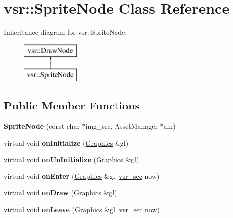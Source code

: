 \hypertarget{classvsr_1_1_sprite_node}{\section{vsr\-:\-:Sprite\-Node Class Reference}
\label{classvsr_1_1_sprite_node}
}
Inheritance diagram for vsr\-:\-:Sprite\-Node\-:\begin{figure}[H]
\begin{center}
\leavevmode
\includegraphics[height=2.000000cm]{classvsr_1_1_sprite_node}
\end{center}
\end{figure}
\subsection*{Public Member Functions}
\begin{DoxyCompactItemize}
\item 
\hypertarget{classvsr_1_1_sprite_node_a8a157008dec678da2f1b74dba12fc35f}{{\bfseries Sprite\-Node} (const char $\ast$img\-\_\-src, Asset\-Manager $\ast$am)}\label{classvsr_1_1_sprite_node_a8a157008dec678da2f1b74dba12fc35f}

\item 
\hypertarget{classvsr_1_1_sprite_node_a4a8f6e4e32af16eb7890baa755e5ce18}{virtual void {\bfseries on\-Initialize} (\hyperlink{classvsr_1_1_graphics}{Graphics} \&gl)}\label{classvsr_1_1_sprite_node_a4a8f6e4e32af16eb7890baa755e5ce18}

\item 
\hypertarget{classvsr_1_1_sprite_node_a9aa1c7c441e1a5964fe6830096677f01}{virtual void {\bfseries on\-Un\-Initialize} (\hyperlink{classvsr_1_1_graphics}{Graphics} \&gl)}\label{classvsr_1_1_sprite_node_a9aa1c7c441e1a5964fe6830096677f01}

\item 
\hypertarget{classvsr_1_1_sprite_node_ac74f05072855a587ab21d7e559fd3e04}{virtual void {\bfseries on\-Enter} (\hyperlink{classvsr_1_1_graphics}{Graphics} \&gl, \hyperlink{classvsr_1_1vsr__sec}{vsr\-\_\-sec} now)}\label{classvsr_1_1_sprite_node_ac74f05072855a587ab21d7e559fd3e04}

\item 
\hypertarget{classvsr_1_1_sprite_node_a683131775d3ac0515369d199a431d17b}{virtual void {\bfseries on\-Draw} (\hyperlink{classvsr_1_1_graphics}{Graphics} \&gl)}\label{classvsr_1_1_sprite_node_a683131775d3ac0515369d199a431d17b}

\item 
\hypertarget{classvsr_1_1_sprite_node_a3d957876cbc7c19008b98b5d8bcbd05d}{virtual void {\bfseries on\-Leave} (\hyperlink{classvsr_1_1_graphics}{Graphics} \&gl, \hyperlink{classvsr_1_1vsr__sec}{vsr\-\_\-sec} now)}\label{classvsr_1_1_sprite_node_a3d957876cbc7c19008b98b5d8bcbd05d}

\end{DoxyCompactItemize}
